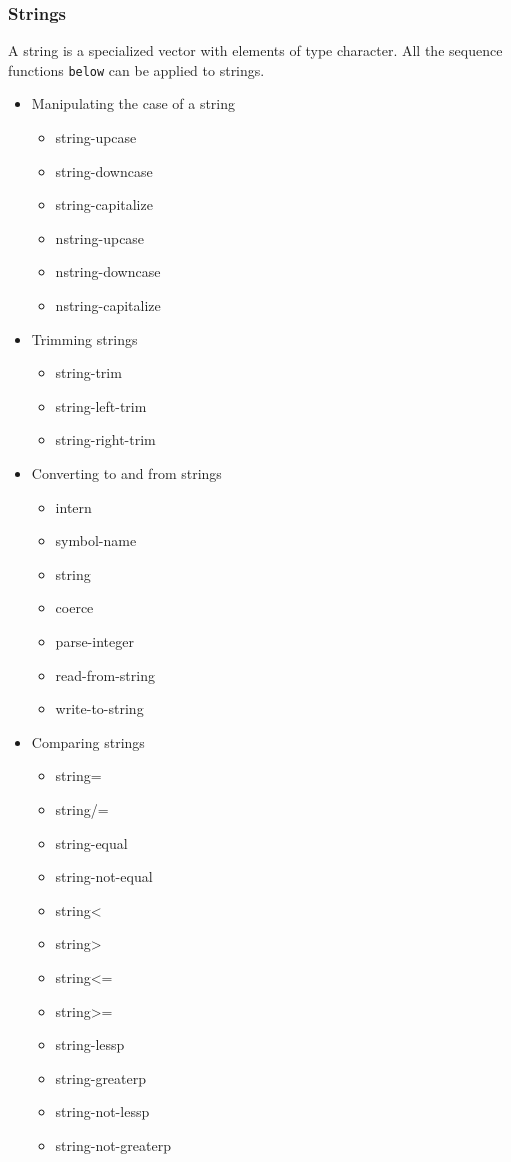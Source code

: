 \documentclass[11pt]{article}
\begin{document}
\subsubsection{Strings}
\label{sec-5-2-3}
A string is a specialized vector with elements of type
character. All the sequence functions \texttt{below} can be applied to
strings.
\begin{itemize}
\item Manipulating the case of a string
\begin{itemize}
\item string-upcase
\item string-downcase
\item string-capitalize
\item nstring-upcase
\item nstring-downcase
\item nstring-capitalize
\end{itemize}
\item Trimming strings
\begin{itemize}
\item string-trim
\item string-left-trim
\item string-right-trim
\end{itemize}
\item Converting to and from strings
\begin{itemize}
\item intern
\item symbol-name
\item string
\item coerce
\item parse-integer
\item read-from-string
\item write-to-string
\end{itemize}
\item Comparing strings
\begin{itemize}
\item string=
\item string/=
\item string-equal
\item string-not-equal
\item string<
\item string>
\item string<=
\item string>=
\item string-lessp
\item string-greaterp
\item string-not-lessp
\item string-not-greaterp
\end{itemize}
\end{itemize}
\end{document}
